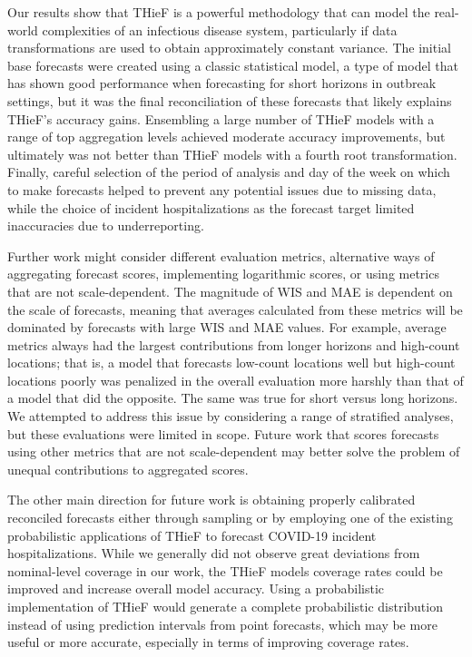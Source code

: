 \documentclass[thesis]{umassthesis}  %
\begin{document}
Our results show that THieF is a powerful methodology that can model the real-world complexities of an infectious disease system, particularly if data transformations are used to obtain approximately constant variance. The initial base forecasts were created using a classic statistical model, a type of model that has shown good performance when forecasting for short horizons in outbreak settings\cite{lauer}, but it was the final reconciliation of these forecasts that likely explains THieF's accuracy gains. Ensembling a large number of THieF models with a range of top aggregation levels achieved moderate accuracy improvements, but ultimately was not better than THieF models with a fourth root transformation. Finally, careful selection of the period of analysis and day of the week on which to make forecasts helped to prevent any potential issues due to missing data, while the choice of incident hospitalizations as the forecast target limited inaccuracies due to underreporting.

Further work might consider different evaluation metrics, alternative ways of aggregating forecast scores, implementing logarithmic scores, or using metrics that are not scale-dependent. The magnitude of WIS and MAE is dependent on the scale of forecasts, meaning that averages calculated from these metrics will be dominated by forecasts with large WIS and MAE values. For example, average metrics always had the largest contributions from longer horizons and high-count locations; that is, a model that forecasts low-count locations well but high-count locations poorly was penalized in the overall evaluation more harshly than that of a model that did the opposite. The same was true for short versus long horizons. We attempted to address this issue by considering a range of stratified analyses, but these evaluations were limited in scope. Future work that scores forecasts using other metrics that are not scale-dependent may better solve the problem of unequal contributions to aggregated scores.

The other main direction for future work is obtaining properly calibrated reconciled forecasts either through sampling or by employing one of the existing probabilistic applications of THieF to forecast COVID-19 incident hospitalizations. While we generally did not observe great deviations from nominal-level coverage in our work, the THieF models coverage rates could be improved and increase overall model accuracy. Using a probabilistic implementation of THieF would generate a complete probabilistic distribution instead of using prediction intervals from point forecasts, which may be more useful or more accurate, especially in terms of improving coverage rates.
\end{document}
